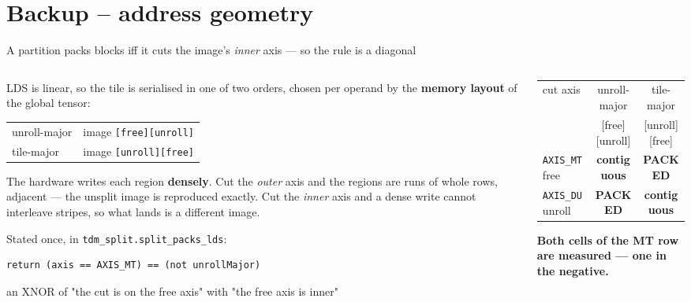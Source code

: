 \documentclass[aspectratio=169,9pt]{beamer}
\newcommand{\tsub}[1]{{\footnotesize\color{gray}#1}}
\newcommand{\key}[1]{\textcolor{acc}{\textbf{#1}}}
\newcommand{\bad}[1]{\textcolor{warn}{\textbf{#1}}}
\newcommand{\good}[1]{\textcolor{ok}{\textbf{#1}}}
\begin{document}
\section{Backup -- address geometry}
\begin{frame}[fragile]{A partition packs blocks iff it cuts the image's \emph{inner} axis --- so the rule is a diagonal}

\begin{columns}[T]
\begin{column}{0.50\textwidth}
\footnotesize
LDS is linear, so the tile is serialised in one of two orders, chosen per operand by the
\key{memory layout} of the global tensor:

\smallskip
\begin{tabular}{@{}ll@{}}
\toprule
unroll-major & image \texttt{[free][unroll]} \\
tile-major   & image \texttt{[unroll][free]} \\
\bottomrule
\end{tabular}

\smallskip
The hardware writes each region \key{densely}. Cut the \emph{outer} axis and the regions are runs
of whole rows, adjacent --- the unsplit image is reproduced exactly. Cut the \emph{inner} axis and
a dense write cannot interleave stripes, so what lands is a different image.

\medskip
Stated once, in \texttt{tdm\_split.split\_packs\_lds}:

\begin{lstlisting}[style=py]
return (axis == AXIS_MT) == (not unrollMajor)
\end{lstlisting}
\tsub{an XNOR of "the cut is on the free axis" with "the free axis is inner"}
\end{column}

\begin{column}{0.48\textwidth}
\centering
\begin{tabular}{@{}lcc@{}}
\toprule
cut axis & unroll-major & tile-major \\
         & \tsub{[free][unroll]} & \tsub{[unroll][free]} \\
\midrule
\texttt{AXIS\_MT} \tsub{free}   & \good{contiguous} & \bad{PACKED} \\
\texttt{AXIS\_DU} \tsub{unroll} & \bad{PACKED}      & \good{contiguous} \\
\bottomrule
\end{tabular}

\medskip
\footnotesize
\key{Both cells of the MT row are measured --- one in the negative.}


\end{column}
\end{columns}
\end{frame}
\end{document}
